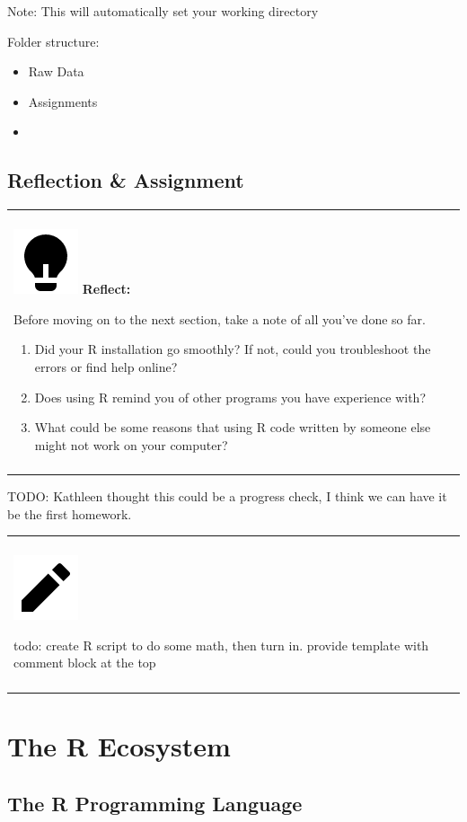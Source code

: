 \documentclass[
]{book}
\newenvironment{reflect}
{
  \begin{center}
  \begin{tabular}{|>{\columncolor{reflect}}p{0.9\textwidth}|}
  \hline\\
  \includegraphics[scale=0.1]{src/images/lightbulb-fill.png}
  \textbf{Reflect:}
}
{\\\\\hline
  \end{tabular}
  \end{center}
}
\newenvironment{assessment}
{
  \begin{center}
  \begin{tabular}{|>{\columncolor{assessment}}p{0.9\textwidth}|}
  \hline\\
  \includegraphics[scale=0.1]{src/images/pencil-fill.png}
}
{\\\\\hline
  \end{tabular}
  \end{center}
}
\begin{document}
Note: This will automatically set your working directory

Folder structure:

\begin{itemize}
\item
  Raw Data
\item
  Assignments
\item
\end{itemize}

\hypertarget{reflection-assignment}{%
\section{Reflection \& Assignment}\label{reflection-assignment}}

\begin{reflect}
Before moving on to the next section, take a note of all you've done so
far.

\begin{enumerate}
\def\arabic{enumi}.{\arabic{enumi}.}
\item
  Did your R installation go smoothly? If not, could you troubleshoot
  the errors or find help online?
\item
  Does using R remind you of other programs you have experience with?
\item
  What could be some reasons that using R code written by someone else
  might not work on your computer?
\end{enumerate}
\end{reflect}

TODO: Kathleen thought this could be a progress check, I think we can have it be the first homework.

\begin{assessment}
todo: create R script to do some math, then turn in. provide template
with comment block at the top
\end{assessment}

\hypertarget{recosystem}{%
\chapter{The R Ecosystem}\label{recosystem}}

\hypertarget{the-r-programming-language}{%
\section{The R Programming Language}\label{the-r-programming-language}}
\end{document}
